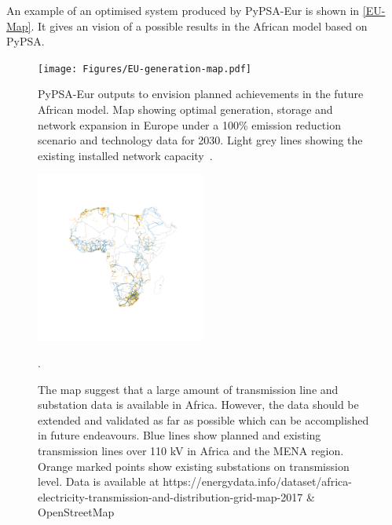\documentclass[conference, a4paper]{IEEEtran}
\begin{document}
An example of an optimised system produced by PyPSA-Eur is shown in \autoref{EU-Map}. It gives an vision of a possible results in the African model based on PyPSA.


\begin{figure}[htbp]
\centerline{\texttt{[image: Figures/EU-generation-map.pdf]}}
\caption{PyPSA-Eur outputs to envision planned achievements in the future African model. Map showing optimal generation, storage and network expansion in Europe under a 100\% emission reduction scenario and technology data for 2030. Light grey lines showing the existing installed network capacity~\cite{parzen-neumann-ea-2021}.}
\label{EU-Map}
\end{figure}


\begin{figure}[htbp]
\centerline{\includegraphics[trim={4cm 8cm 4cm 8cm},clip,width = 0.5\textwidth]{Figures/africa_transmission_network_and_substations.png}}
\caption{The map suggest that a large amount of transmission line and substation data is available in Africa. However, the data should be extended and validated as far as possible which can be accomplished in future endeavours. Blue lines show planned and existing transmission lines over 110 kV in Africa and the MENA region. Orange marked points show existing substations on transmission level. Data is available at https://energydata.info/dataset/africa-electricity-transmission-and-distribution-grid-map-2017 \& OpenStreetMap}.
\label{AfricaMApTransmission}
\end{figure}
\end{document}
